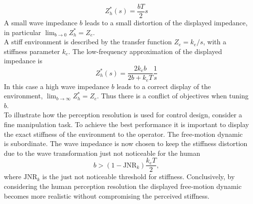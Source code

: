 \documentclass[a4paper,twoside, openright,12pt]{report}
\begin{document}
\begin{equation}
Z_h^*(s) = \frac{bT}{2}s
\end{equation}
A small wave impedance $b$ leads to a small distortion of the displayed impedance, in particular $\lim_{b\rightarrow0} Z_h^* = Z_e$.\\ 
A stiff environment is described by the transfer function $Z_e = k_e/s$, with a stiffness parameter $k_e$. The low-frequency approximation of the displayed impedance is
\begin{equation}
Z_h^*(s) = \frac{2k_e b}{2b+k_e T}\frac{1}{s}
\end{equation}
In this case a high wave impedance $b$ leads to a correct display of the environment, $\lim_{b \rightarrow \infty} Z_h^* = Z_e$. Thus there is a conflict of objectives when tuning $b$. \\
To illustrate how the perception resolution is used for control design, consider a fine manipulation task. To achieve the best performance it is important to display the exact stiffness of the environment to the operator. The free-motion dynamic is subordinate. The wave impedance is now chosen to keep the stiffness distortion due to the wave transformation just not noticeable for the human
\begin{equation}
b > (1-\mathrm{JNR}_k) \frac{k_e T}{2}, 
\end{equation}
where $\mathrm{JNR}_k$ is the just not noticeable threshold for stiffness. Conclusively, by considering the human perception resolution the displayed free-motion dynamic becomes more realistic without compromising the perceived stiffness.  
     
\end{document}
